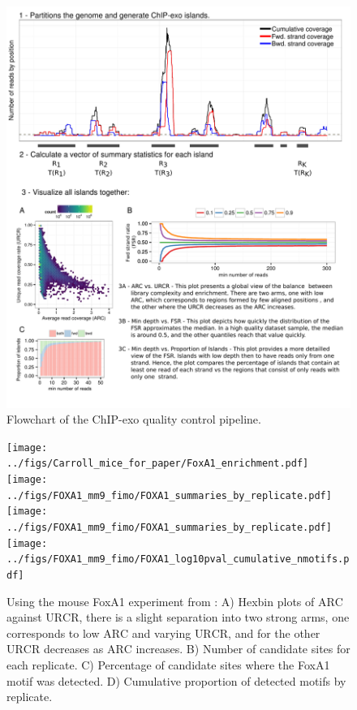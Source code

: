 \documentclass{bmcart}\usepackage[]{graphicx}\usepackage[]{color}
\begin{document}

\newpage

\begin{figure}[h!]
  \centering
  \includegraphics[width = \textwidth]{../figs/for_paper/coverage_diagram2.pdf}
  \caption{Flowchart of the ChIP-exo quality control pipeline.}
  \label{fig:qcdiagram}
\end{figure}

\newpage

\begin{figure}[h!]
  \centering
  \texttt{[image: ../figs/Carroll\_mice\_for\_paper/FoxA1\_enrichment.pdf]}
  \newline
  \texttt{[image: ../figs/FOXA1\_mm9\_fimo/FOXA1\_summaries\_by\_replicate.pdf]}
  \texttt{[image: ../figs/FOXA1\_mm9\_fimo/FOXA1\_summaries\_by\_replicate.pdf]}
  \texttt{[image: ../figs/FOXA1\_mm9\_fimo/FOXA1\_log10pval\_cumulative\_nmotifs.pdf]}
  \caption{Using the mouse FoxA1 experiment from \cite{exoillumina}:
    A) Hexbin plots of $\mbox{ARC}$ against $\mbox{URCR}$, there is a
    slight separation into two strong arms, one corresponds to low
    $\mbox{ARC}$ and varying $\mbox{URCR}$, and for the other
    $\mbox{URCR}$ decreases as $\mbox{ARC}$ increases. B) Number of
    candidate sites for each replicate. C) Percentage of candidate
    sites where the FoxA1 motif was detected. D) Cumulative
    proportion of detected motifs by replicate.}
  \label{fig:enrich}
\end{figure}
\end{document}
